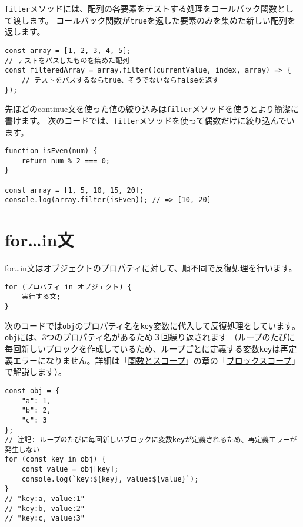 \texttt{filter}メソッドには、配列の各要素をテストする処理をコールバック関数として渡します。
コールバック関数が\texttt{true}を返した要素のみを集めた新しい配列を返します。

\begin{lstlisting}
const array = [1, 2, 3, 4, 5];
// テストをパスしたものを集めた配列
const filteredArray = array.filter((currentValue, index, array) => {
    // テストをパスするならtrue、そうでないならfalseを返す
});
\end{lstlisting}

先ほどのcontinue文を使った値の絞り込みは\texttt{filter}メソッドを使うとより簡潔に書けます。
次のコードでは、\texttt{filter}メソッドを使って偶数だけに絞り込んでいます。

\begin{lstlisting}
function isEven(num) {
    return num % 2 === 0;
}

const array = [1, 5, 10, 15, 20];
console.log(array.filter(isEven)); // => [10, 20]
\end{lstlisting}

\hypertarget{for-in-statement}{%
\section{for\ldots{}in文}\label{for-in-statement}}

for\ldots{}in文はオブジェクトのプロパティに対して、順不同で反復処理を行います。

\begin{lstlisting}
for (プロパティ in オブジェクト) {
    実行する文;
}
\end{lstlisting}

次のコードでは\texttt{obj}のプロパティ名を\texttt{key}変数に代入して反復処理をしています。
\texttt{obj}には、3つのプロパティ名があるため３回繰り返されます
（ループのたびに毎回新しいブロックを作成しているため、ループごとに定義する変数\texttt{key}は再定義エラーになりません。詳細は「\href{.../function-scope/README.md}{関数とスコープ}」の章の「\href{.../function-scope/README.md\#block-scope}{ブロックスコープ}」で解説します）。

\begin{lstlisting}
const obj = {
    "a": 1,
    "b": 2,
    "c": 3
};
// 注記: ループのたびに毎回新しいブロックに変数keyが定義されるため、再定義エラーが発生しない
for (const key in obj) {
    const value = obj[key];
    console.log(`key:${key}, value:${value}`);
}
// "key:a, value:1"
// "key:b, value:2"
// "key:c, value:3"
\end{lstlisting}

